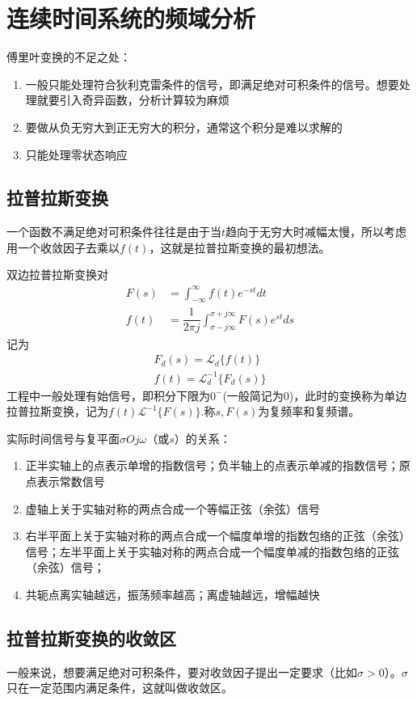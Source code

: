 \chapter{连续时间系统的频域分析}
傅里叶变换的不足之处：
\begin{enumerate}
    \item 一般只能处理符合狄利克雷条件的信号，即满足绝对可积条件的信号。想要处理就要引入奇异函数，分析计算较为麻烦
    \item 要做从负无穷大到正无穷大的积分，通常这个积分是难以求解的
    \item 只能处理零状态响应 
\end{enumerate}
\section{拉普拉斯变换}
一个函数不满足绝对可积条件往往是由于当$t$趋向于无穷大时减幅太慢，所以考虑用一个收敛因子去乘以$f(t)$，这就是拉普拉斯变换的最初想法。

双边拉普拉斯变换对
\begin{align}
    F(s)&=\int_{-\infty}^{\infty}f(t)e^{-st}dt\\
    f(t)&=\dfrac{1}{2\pi j}\int_{\sigma -j\infty}^{\sigma +j\infty}F(s)e^{st}ds
\end{align}
记为
\begin{align}
    F_d(s)=\mathcal{L}_d\{f(t)\}\\
    f(t)=\mathcal{L}^{-1}_d\{F_d(s)\}
\end{align}
工程中一般处理有始信号，即积分下限为$0^-$(一般简记为0)，此时的变换称为单边拉普拉斯变换，记为$f(t)\mathcal{L}^{-1}\{F(s)\}$.称$s,F(s)$为复频率和复频谱。

实际时间信号与复平面$\sigma O j\omega$（或$s$）的关系：
\begin{enumerate}
    \item 正半实轴上的点表示单增的指数信号；负半轴上的点表示单减的指数信号；原点表示常数信号
    \item 虚轴上关于实轴对称的两点合成一个等幅正弦（余弦）信号
    \item 右半平面上关于实轴对称的两点合成一个幅度单增的指数包络的正弦（余弦）信号；左半平面上关于实轴对称的两点合成一个幅度单减的指数包络的正弦（余弦）信号；
    \item 共轭点离实轴越远，振荡频率越高；离虚轴越远，增幅越快
\end{enumerate}
\section{拉普拉斯变换的收敛区}
一般来说，想要满足绝对可积条件，要对收敛因子提出一定要求（比如$\sigma>0$）。$\sigma$只在一定范围内满足条件，这就叫做收敛区。

